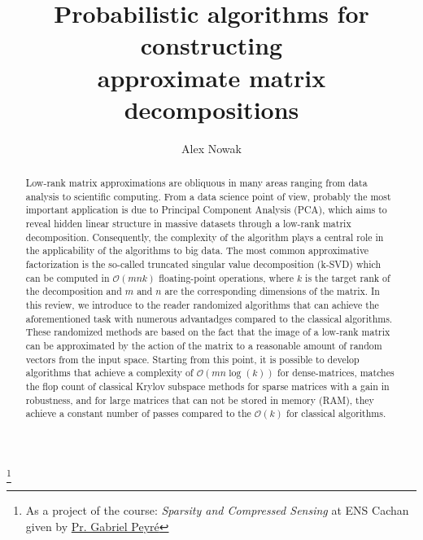 \documentclass{amsart}
\theoremstyle{definition}
\theoremstyle{remark}
\numberwithin{equation}{section}
\begin{document}
\title{Probabilistic algorithms for constructing \\ approximate matrix decompositions}

\author{Alex Nowak}
\address{Master "Math\'ematiques, Vision et Apprentissage" \\
\'Ecole Normale Sup\'erieure de Cachan}
\thanks{As a project of the course: \textit{Sparsity and Compressed Sensing}
at ENS Cachan given by \href{http://www.gpeyre.com/}{Pr. Gabriel Peyr\'e}}






\begin{abstract}
Low-rank matrix approximations are obliquous in many areas ranging
from data analysis to scientific computing. From a data science point of
view, probably the most important application is due to Principal
Component Analysis (PCA), which aims to reveal hidden linear structure in
massive datasets through a low-rank matrix decomposition. 
Consequently, the complexity of the algorithm plays a central role in the
applicability of the algorithms to big data. The most common
approximative factorization
is the so-called truncated singular value decomposition (k-SVD) which can be 
computed in $\mathcal{O}(mnk)$ floating-point operations, where $k$ is the target rank
of the decomposition and $m$ and $n$ are the corresponding dimensions of the 
matrix.
In this review, we introduce to the reader randomized algorithms 
that can achieve the aforementioned task with numerous advantadges compared
to the classical algorithms. These randomized methods are based on the fact that the
image of a low-rank matrix can be approximated by the action
of the matrix to a reasonable amount of random vectors from the input space.
Starting from this point, it is possible to develop
algorithms that achieve a complexity of $\mathcal{O}(mn\log(k))$ for 
dense-matrices, matches the flop count of classical
Krylov subspace methods for sparse matrices with a gain in robustness, and
for large matrices that can not be stored in memory (RAM), they
achieve a constant number of passes compared to the 
$\mathcal{O}(k)$ for classical algorithms.
\end{abstract}
\end{document}
